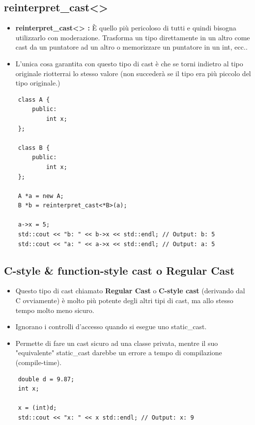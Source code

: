 \subsection{reinterpret\_cast<>}

\begin{itemize}
	\item \textsf{\small \textbf{reinterpret\_cast<> :} È quello più pericoloso di tutti e quindi bisogna utilizzarlo con moderazione. Trasforma un tipo direttamente in un altro come cast da un puntatore ad un altro o memorizzare un puntatore in un int, ecc..}
	\item \textsf{\small L'unica cosa garantita con questo tipo di cast è che se torni indietro al tipo originale riotterrai lo stesso valore (non succederà se il tipo era più piccolo del tipo originale.)}
\end{itemize}

\begin{lstlisting}
	class A {
		public:
			int x;
	};

	class B {
		public:
			int x;
	};

	A *a = new A;
	B *b = reinterpret_cast<*B>(a);
	
	a->x = 5;
	std::cout << "b: " << b->x << std::endl; // Output: b: 5
	std::cout << "a: " << a->x << std::endl; // Output: a: 5
\end{lstlisting}

\subsection{C-style \& function-style cast o Regular Cast}

\begin{itemize}
	\item \textsf{\small Questo tipo di cast chiamato \textbf{Regular Cast} o \textbf{C-style cast} (derivando dal C ovviamente) è molto più potente degli altri tipi di cast, ma allo stesso tempo molto meno sicuro.}
	\item \textsf{\small Ignorano i controlli d'accesso quando si esegue uno static\_cast.}
	\item \textsf{\small Permette di fare un cast sicuro ad una classe privata, mentre il suo "equivalente" static\_cast darebbe un errore a tempo di compilazione (compile-time).}
\end{itemize}

\begin{lstlisting}
	double d = 9.87;
	int x;
	
	x = (int)d;
	std::cout << "x: " << x std::endl; // Output: x: 9
\end{lstlisting}

